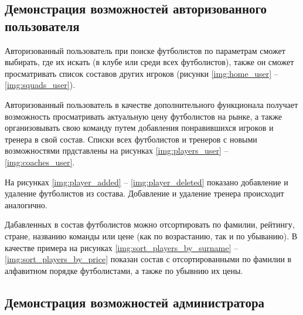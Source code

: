 \subsection{Демонстрация возможностей авторизованного пользователя}

Авторизованный пользователь при поиске футболистов по параметрам сможет выбирать, где их искать (в клубе или среди всех футболистов), также он сможет просматривать список составов других игроков (рисунки \ref{img:home_user} -- \ref{img:squads_user}).


\clearpage

Авторизованный пользователь в качестве дополнительного функционала получает возможность просматривать актуальную цену футболистов на рынке, а также организовывать свою команду путем добавления понравившихся игроков и тренера в свой состав. Списки всех футболистов и тренеров с новыми возможностями прдставлены на рисунках \ref{img:players_user} -- \ref{img:coaches_user}.


\clearpage

На рисунках \ref{img:player_added} -- \ref{img:player_deleted} показано добавление и удаление футболистов из состава. Добавление и удаление тренера происходит аналогично.


\clearpage

Дабавленных в состав футболистов можно отсортировать по фамилии, рейтингу, стране, названию команды или цене (как по возрастанию, так и по убыванию). В качестве примера на рисунках \ref{img:sort_players_by_surname} -- \ref{img:sort_players_by_price} показан состав с отсортированными по фамилии в алфавитном порядке футболистами, а также по убывнию их цены.


\subsection{Демонстрация возможностей администратора}

